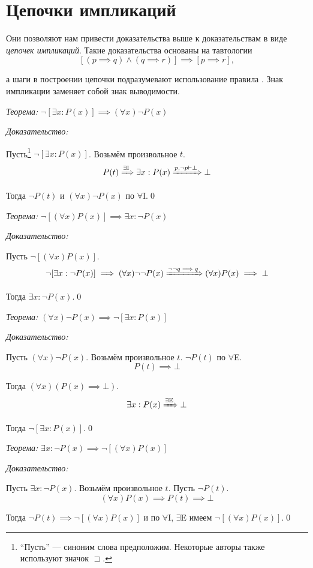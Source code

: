 \section{Цепочки импликаций}

Они позволяют нам привести доказательства выше к доказательствам в виде
{\it цепочек импликаций}. Такие доказательства основаны на тавтологии
\[
	[(p\implies q)\land(q\implies r)]\implies [p\implies r],
\]

а шаги в построении цепочки подразумевают использование правила \implic{}.
Знак импликации заменяет собой знак выводимости.

{\it Теорема:} $\lnot[\exists x:P(x)]\implies (\forall x)\lnot P(x)$

{\it Доказательство:}

Пусть\footnote{
	``Пусть'' --- синоним слова предположим. Некоторые авторы также
	используют значок $\sqsupset$.
} $\lnot[\exists x:P(x)]$. Возьмём произвольное $t$.
\[
	P(t)\xRightarrow{\text{$\exists$I}} \exists x:P(x)
	\xRightarrow{p,\lnot p\vdash\bot} \bot
\]

Тогда $\lnot P(t)$ и $(\forall x)\lnot P(x)$
по $\forall$I.\qed

{\it Теорема:} $\lnot[(\forall x)P(x)]\implies \exists x:\lnot P(x)$

{\it Доказательство:}

Пусть $\lnot[(\forall x)P(x)]$.
\[
	\lnot[\exists x:\lnot P(x)]\implies (\forall x)\lnot\lnot P(x)
	\xRightarrow{\lnot\lnot q\implies q} (\forall x)P(x)\implies\bot
\]

Тогда $\exists x:\lnot P(x)$.\qed

{\it Теорема:} $(\forall x)\lnot P(x)\implies \lnot[\exists x:P(x)]$

{\it Доказательство:}

Пусть $(\forall x)\lnot P(x)$. Возьмём произвольное $t$. $\lnot P(t)$ по $\forall$E.
\[
	P(t)\implies \bot
\]

Тогда $(\forall x)(P(x)\implies \bot)$.
\[
	\exists x:P(x)\xRightarrow{\text{$\exists$E}} \bot
\]

Тогда $\lnot[\exists x:P(x)]$.\qed

{\it Теорема:} $\exists x:\lnot P(x)\implies\lnot[(\forall x)P(x)]$

{\it Доказательство:}

Пусть $\exists x:\lnot P(x)$. Возьмём произвольное $t$. Пусть $\lnot P(t)$.
\[
	(\forall x)P(x)\implies P(t)\implies \bot
\]

Тогда ${\lnot P(t)\implies \lnot[(\forall x)P(x)]}$ и по $\forall$I, $\exists$E
имеем $\lnot[(\forall x)P(x)]$.\qed

